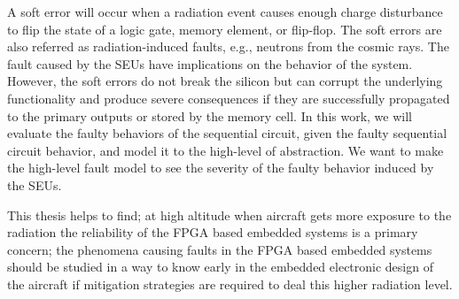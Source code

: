 A soft error will occur when a radiation event causes enough charge disturbance to flip the state of a logic gate, memory element, or flip-flop. The soft errors are also referred as radiation-induced faults, e.g., neutrons from the cosmic rays. The fault caused by the SEUs have implications on the behavior of the system. However, the soft errors do not break the silicon but can corrupt the underlying functionality and produce severe consequences if they are successfully propagated to the primary outputs or stored by the memory cell. In this work, we will evaluate the faulty behaviors of the sequential circuit, given the faulty sequential circuit behavior, and model it to the high-level of abstraction. We want to make the high-level fault model to see the severity of the faulty behavior induced by the SEUs.



This thesis helps to find; at high altitude when aircraft gets more exposure to the radiation the reliability of the FPGA based embedded systems is a primary concern; the phenomena causing faults in the FPGA based embedded systems should be studied in a way to know early in the embedded electronic design of the aircraft if mitigation strategies are required to deal this higher radiation level. 

